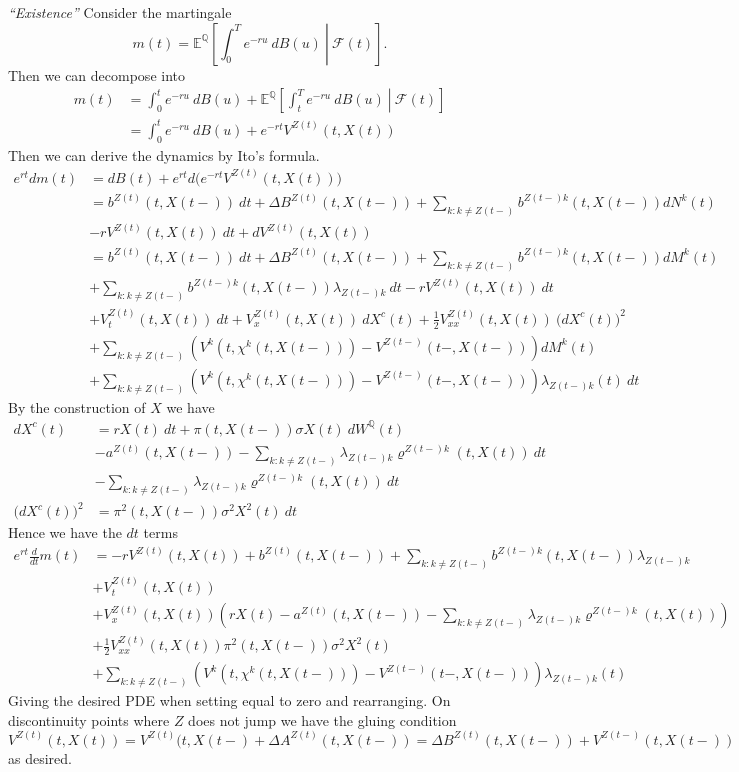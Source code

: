 \documentclass[
]{book}
\begin{document}
\emph{``Existence''} Consider the martingale
\[
m(t)=\mathbb E^{\mathbb Q}\left[\left. \int_0^Te^{-ru}\ dB(u)\ \right\vert\ \mathcal F(t)\right].
\]
Then we can decompose into
\begin{align*}
m(t)&=\int_0^te^{-ru}\ dB(u)+\mathbb E^{\mathbb Q}\left[\left. \int_t^Te^{-ru}\ dB(u)\ \right\vert\ \mathcal F(t)\right]\\
&=\int_0^te^{-ru}\ dB(u)+e^{-rt}V^{Z(t)}(t,X(t))
\end{align*}
Then we can derive the dynamics by Ito's formula.
\begin{align*}
e^{rt}dm(t)&=dB(t)+e^{rt}d\Big(e^{-rt}V^{Z(t)}(t,X(t))\Big)\\
&=b^{Z(t)}(t,X(t-))\ dt+\Delta B^{Z(t)}(t,X(t-))+\sum_{k:k\ne Z(t-)}b^{Z(t-)k}(t,X(t-))dN^k(t)\\
&-rV^{Z(t)}(t,X(t))\ dt+dV^{Z(t)}(t,X(t))\\
&=b^{Z(t)}(t,X(t-))\ dt+\Delta B^{Z(t)}(t,X(t-))+\sum_{k:k\ne Z(t-)}b^{Z(t-)k}(t,X(t-))dM^k(t)\\
&+\sum_{k:k\ne Z(t-)}b^{Z(t-)k}(t,X(t-))\lambda_{Z(t-)k}\ dt-rV^{Z(t)}(t,X(t))\ dt\\
&+V_t^{Z(t)}(t,X(t))\ dt+V_x^{Z(t)}(t,X(t))\ dX^c(t)+\frac{1}{2}V_{xx}^{Z(t)}(t,X(t))\ \big(dX^c(t)\big)^2\\
&+\sum_{k:k\ne Z(t-)}\left(V^{k}(t,\chi^k(t,X(t-)))-V^{Z(t-)}(t-,X(t-))\right)dM^k(t)\\
&+\sum_{k:k\ne Z(t-)}\left(V^{k}(t,\chi^k(t,X(t-)))-V^{Z(t-)}(t-,X(t-))\right)\lambda_{Z(t-)k}(t)\ dt
\end{align*}
By the construction of \(X\) we have
\begin{align*}
dX^c(t)&=rX(t)\ dt+\pi(t,X(t-))\sigma X(t)\ dW^\mathbb Q(t)\\
&-a^{Z(t)}(t,X(t-))-\sum_{k:k\ne Z(t-)}\lambda_{Z(t-)k}\varrho^{Z(t-)k}(t,X(t))\ dt\\
&-\sum_{k:k\ne Z(t-)}\lambda_{Z(t-)k}\varrho^{Z(t-)k}(t,X(t))\ dt\\
\big(dX^c(t)\big)^2&=\pi^2(t,X(t-))\sigma^2 X^2(t)\ dt
\end{align*}
Hence we have the \(dt\) terms
\begin{align*}
e^{rt}\frac{d}{dt}m(t)&=-rV^{Z(t)}(t,X(t))+b^{Z(t)}(t,X(t-))+\sum_{k:k\ne Z(t-)}b^{Z(t-)k}(t,X(t-))\lambda_{Z(t-)k}\\
&+V_t^{Z(t)}(t,X(t))\\
&+V_x^{Z(t)}(t,X(t))\left(rX(t)-a^{Z(t)}(t,X(t-))-\sum_{k:k\ne Z(t-)}\lambda_{Z(t-)k}\varrho^{Z(t-)k}(t,X(t))\right)\\
&+\frac{1}{2}V_{xx}^{Z(t)}(t,X(t))\pi^2(t,X(t-))\sigma^2 X^2(t)\\
&+\sum_{k:k\ne Z(t-)}\left(V^{k}(t,\chi^k(t,X(t-)))-V^{Z(t-)}(t-,X(t-))\right)\lambda_{Z(t-)k}(t)
\end{align*}
Giving the desired PDE when setting equal to zero and rearranging. On discontinuity points where \(Z\) does not jump we have the gluing condition
\[
V^{Z(t)}(t,X(t))=V^{Z(t)}(t,X(t-)+\Delta A^{Z(t)}(t,X(t-))=\Delta B^{Z(t)}(t,X(t-))+V^{Z(t-)}(t,X(t-))
\]
as desired.
\end{document}
